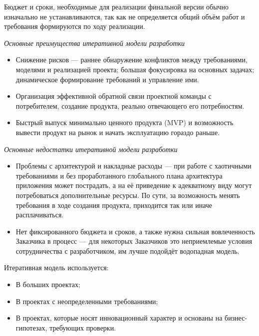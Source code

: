 \documentclass[a4paper,14pt]{extarticle}
\begin{document}
 	Бюджет и сроки, необходимые для реализации финальной версии обычно изначально не устанавливаются, так как не определяется общий объём работ и требования формируются по ходу реализации.
 	
 	\textit{Основные преимущества итеративной модели разработки}
 	
 	\begin{itemize}
 		\item Снижение рисков — раннее обнаружение конфликтов между требованиями, моделями и реализацией проекта; большая фокусировка на основных задачах; динамическое формирование требований и управление ими.
 		
 		\item Организация эффективной обратной связи проектной команды с потребителем, создание продукта, реально отвечающего его потребностям.
 		
 		\item Быстрый выпуск минимально ценного продукта (MVP) и возможность вывести продукт на рынок и начать эксплуатацию гораздо раньше.
 	\end{itemize}
 	
 	\textit{Основные недостатки итеративной модели разработки}
 	
 	\begin{itemize}
 		\item Проблемы с архитектурой и накладные расходы — при работе с хаотичными требованиями и без проработанного глобального плана архитектура приложения может пострадать, а на её приведение к адекватному виду могут потребоваться дополнительные ресурсы. По сути, за возможность менять требования в ходе создания продукта, приходится так или иначе расплачиваться.
 		
 		\item Нет фиксированного бюджета и сроков, а также нужна сильная вовлеченность Заказчика в процесс — для некоторых Заказчиков это неприемлемые условия сотрудничества с разработчиком, им лучше подойдёт водопадная модель.
 	\end{itemize}
 
 	Итеративная модель используется:
 	\begin{itemize}
 		\item В больших проектах;
 		\item В проектах с неопределенными требованиями;
 		\item В проектах, которые носят инновационный характер и основаны на бизнес-гипотезах, требующих проверки.
 	\end{itemize}
 	
\end{document}
